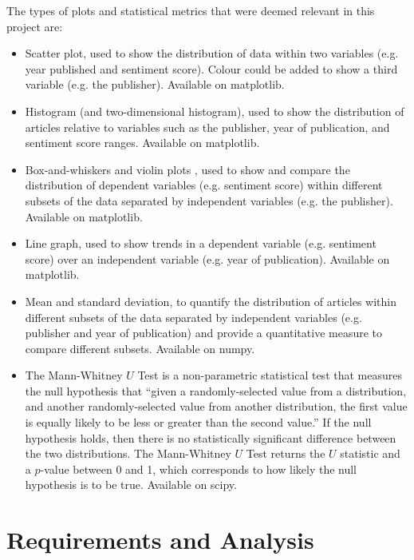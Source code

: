 \documentclass{report}
\begin{document}
The types of plots and statistical metrics that were deemed relevant in this project are:
\begin{itemize}
	\item Scatter plot, used to show the distribution of data within two variables (e.g. year published and sentiment score). 
		Colour could be added to show a third variable (e.g. the publisher).
		Available on matplotlib.
	\item Histogram (and two-dimensional histogram), used to show the distribution of articles relative to variables such as the publisher, year of publication, and sentiment score ranges. 
		Available on matplotlib.
	\item Box-and-whiskers \cite{tukey1977exploratory} and violin plots \cite{hintze1998violin}, used to show and compare the distribution of dependent variables (e.g. sentiment score) within different subsets of the data separated by independent variables (e.g. the publisher).
		Available on matplotlib.
	\item Line graph, used to show trends in a dependent variable (e.g. sentiment score) over an independent variable (e.g. year of publication).
		Available on matplotlib.
	\item Mean and standard deviation, to quantify the distribution of articles within different subsets of the data separated by independent variables (e.g. publisher and year of publication) and provide a quantitative measure to compare different subsets.
		Available on numpy.
	\item The Mann-Whitney $U$ Test \cite{mann1947test} is a non-parametric statistical test that measures the null hypothesis that ``given a randomly-selected value from a distribution, and another randomly-selected value from another distribution, the first value is equally likely to be less or greater than the second value.''
		If the null hypothesis holds, then there is no statistically significant difference between the two distributions.
		The Mann-Whitney $U$ Test returns the $U$ statistic and a $p$-value between 0 and 1, which corresponds to how likely the null hypothesis is to be true.
		Available on scipy.
\end{itemize}

\chapter{Requirements and Analysis} \label{Requirements and Analysis}  %

\end{document}
